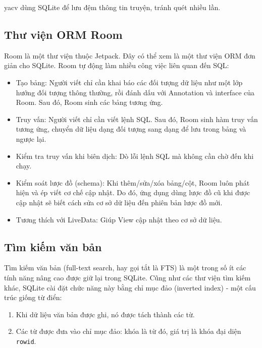 \documentclass[../../thesis]{subfiles}
\begin{document}
yacv dùng SQLite để lưu đệm thông tin truyện, tránh quét nhiều lần.

\subsection{Thư viện ORM Room}\label{sec:room}

Room là một thư viện thuộc Jetpack. Đây có thể xem là một thư viện ORM đơn giản
cho SQLite. Room tự động làm nhiều công việc liên quan đến SQL:

\begin{itemize}
    \item
        Tạo bảng: Người viết chỉ cần khai báo các đối tượng dữ liệu như một lớp
        hướng đối tượng thông thường, rồi đánh dấu với Annotation và interface
        của Room. Sau đó, Room sinh các bảng tương ứng.
    \item
        Truy vấn: Người viết chỉ cần viết lệnh SQL. Sau đó, Room sinh hàm truy
        vấn tương ứng, chuyển dữ liệu dạng đối tượng sang dạng để lưu trong bảng
        và ngược lại.
    \item
        Kiểm tra truy vấn khi biên dịch: Dò lỗi lệnh SQL mà không cần chờ đến
        khi chạy.
    \item
        Kiểm soát lược đồ (schema): Khi thêm/sửa/xóa bảng/cột, Room luôn phát
        hiện và ép viết cơ chế cập nhật. Do đó, ứng dụng dùng lược đồ cũ khi
        được cập nhật sẽ biết cách sửa cơ sở dữ liệu đến phiên bản lược đồ mới.
    \item
        Tương thích với LiveData: Giúp View cập nhật theo cơ sở dữ liệu.
\end{itemize}

\subsection{Tìm kiếm văn bản}\label{sec:fts}

Tìm kiếm văn bản (full-text search, hay gọi tắt là FTS) là một trong số ít các
tính năng nâng cao được giữ lại trong SQLite. Cũng như các thư viện tìm kiếm
khác, SQLite cài đặt chức năng này bằng chỉ mục đảo (inverted index) - một cấu
trúc giống từ điển:

\begin{enumerate}
    \item
        Khi dữ liệu văn bản được ghi, nó được tách thành các từ.
    \item
        Các từ được đưa vào chỉ mục đảo: khóa là từ đó, giá trị là khóa đại diện
        \texttt{rowid}.
\end{enumerate}
\end{document}
